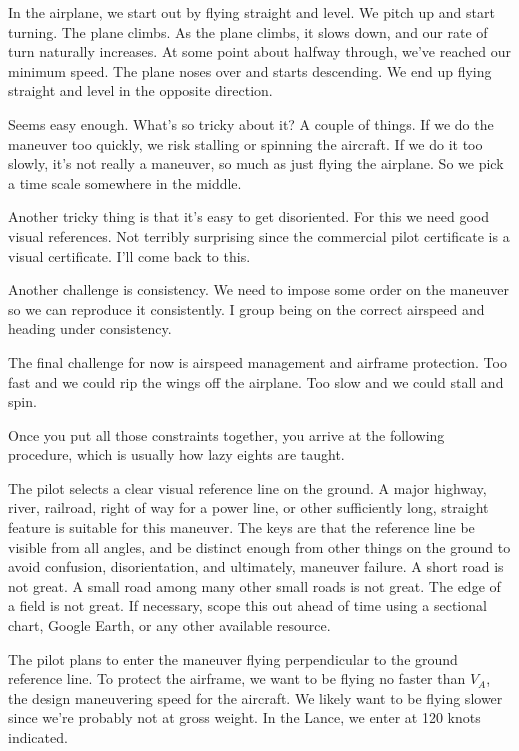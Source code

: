 In the airplane, we start out by flying straight and level. We pitch up and start turning. The plane climbs. As the plane climbs, it slows down, and our rate of turn naturally increases. At some point about halfway through, we've reached our minimum speed. The plane noses over and starts descending. We end up flying straight and level in the opposite direction.

Seems easy enough. What's so tricky about it? A couple of things. If we do the maneuver too quickly, we risk stalling or spinning the aircraft. If we do it too slowly, it's not really a maneuver, so much as just flying the airplane. So we pick a time scale somewhere in the middle.

Another tricky thing is that it's easy to get disoriented. For this we need good visual references. Not terribly surprising since the commercial pilot certificate is a visual certificate. I'll come back to this.

Another challenge is consistency. We need to impose some order on the maneuver so we can reproduce it consistently. I group being on the correct airspeed and heading under consistency.

The final challenge for now is airspeed management and airframe protection. Too fast and we could rip the wings off the airplane. Too slow and we could stall and spin.

Once you put all those constraints together, you arrive at the following procedure, which is usually how lazy eights are taught.

The pilot selects a clear visual reference line on the ground. A major highway, river, railroad, right of way for a power line, or other sufficiently long, straight feature is suitable for this maneuver. The keys are that the reference line be visible from all angles, and be distinct enough from other things on the ground to avoid confusion, disorientation, and ultimately, maneuver failure. A short road is not great. A small road among many other small roads is not great. The edge of a field is not great. If necessary, scope this out ahead of time using a sectional chart, Google Earth, or any other available resource.

The pilot plans to enter the maneuver flying perpendicular to the ground reference line. To protect the airframe, we want to be flying no faster than $V_A$, the design maneuvering speed for the aircraft. We likely want to be flying slower since we're probably not at gross weight. In the Lance, we enter at 120 knots indicated.

